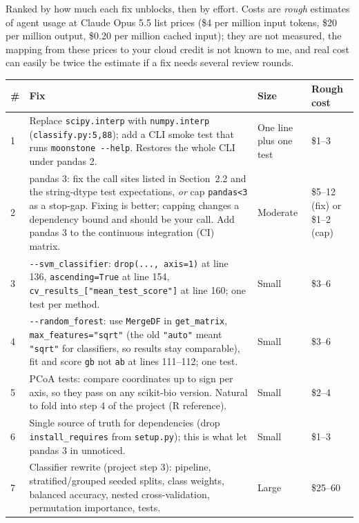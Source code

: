 \documentclass[11pt,a4paper]{article}
\newcommand{\code}[1]{\texttt{\small #1}}
\begin{document}
Ranked by how much each fix unblocks, then by effort. Costs are \emph{rough} estimates of agent usage at Claude Opus 5.5
list prices (\$4 per million input tokens, \$20 per million output, \$0.20 per million cached input); they are not measured,
the mapping from these prices to your cloud credit is not known to me, and real cost can easily be twice the estimate if a
fix needs several review rounds.

\begin{longtable}{@{}P{0.4cm}P{9.6cm}P{2.2cm}P{2.5cm}@{}}
\toprule
\textbf{\#} & \textbf{Fix} & \textbf{Size} & \textbf{Rough cost}\\
\midrule
{} & Replace \code{scipy.interp} with \code{numpy.interp} (\code{classify.py:5,88}); add a CLI smoke test that runs
\code{moonstone -{}-help}. Restores the whole CLI under pandas 2. & One line plus one test & \$1--3\\
2 & pandas 3: fix the call sites listed in Section~2.2 and the string-dtype test expectations, \emph{or} cap
\code{pandas<3} as a stop-gap. Fixing is better; capping changes a dependency bound and should be your call. Add pandas 3 to
the continuous integration (CI) matrix. & Moderate & \$5--12 (fix) or \$1--2 (cap)\\
3 & \code{-{}-svm\_classifier}: \code{drop(..., axis=1)} at line 136, \code{ascending=True} at line 154,
\code{cv\_results\_["mean\_test\_score"]} at line 160; one test per method. & Small & \$3--6\\
4 & \code{-{}-random\_forest}: use \code{MergeDF} in \code{get\_matrix}, \code{max\_features="sqrt"} (the old
\code{"auto"} meant \code{"sqrt"} for classifiers, so results stay comparable), fit and score \code{gb} not \code{ab} at lines
111--112; one test. & Small & \$3--6\\
5 & PCoA tests: compare coordinates up to sign per axis, so they pass on any scikit-bio version. Natural to fold into step 4
of the project (R reference). & Small & \$2--4\\
6 & Single source of truth for dependencies (drop \code{install\_requires} from \code{setup.py}); this is what let pandas 3 in
unnoticed. & Small & \$1--3\\
7 & Classifier rewrite (project step 3): pipeline, stratified/grouped seeded splits, class weights, balanced accuracy, nested
cross-validation, permutation importance, tests. & Large & \$25--60\\
\bottomrule
\end{longtable}
\end{document}
